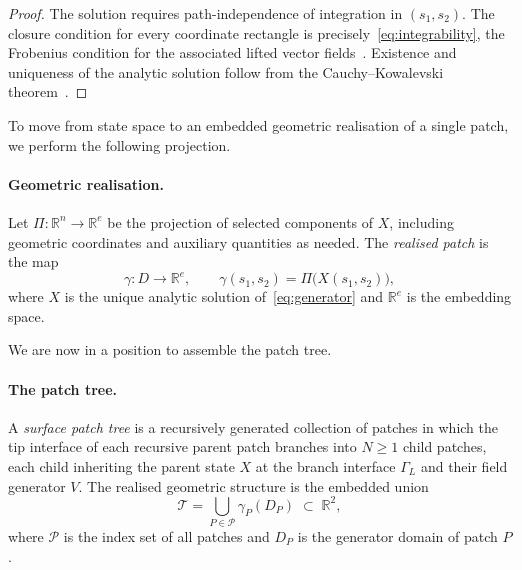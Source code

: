 \documentclass[11pt,a4paper]{article}
\begin{document}
\begin{proof}
The solution requires path-independence of integration in
$(s_1,s_2)$. The closure condition for every coordinate rectangle
is precisely~\eqref{eq:integrability}, the Frobenius condition
for the associated lifted vector fields~\cite{lee2013}. Existence
and uniqueness of the analytic solution follow from the
Cauchy--Kowalevski theorem~\cite{john1982}.
\end{proof}

To move from state space to an embedded geometric realisation of a single patch, 
we perform the following projection.

\paragraph{Geometric realisation.}
Let $\Pi : \mathbb{R}^n \to \mathbb{R}^e$ be the projection of selected
components of $X$, including geometric coordinates and auxiliary quantities 
as needed. The \emph{realised patch} is the
map
\begin{equation}
    \gamma : D \to \mathbb{R}^e, \qquad
    \gamma(s_1,s_2) = \Pi\bigl(X(s_1,s_2)\bigr),
    \label{eq:realization}
\end{equation}
where $X$ is the unique analytic solution of~\eqref{eq:generator} and 
$\mathbb{R}^e$ is the embedding space. 

We are now in a position to assemble the patch tree.
\paragraph{The patch tree.}
A \emph{surface patch tree} is a recursively generated collection
of patches in which the tip interface of each recursive parent patch
branches into $N \geq 1$ child patches, each child inheriting the parent
state $X$ at the branch interface $\Gamma_L$ and their field generator $V$. The realised 
geometric structure is the embedded union
\begin{equation}
    \mathcal{T} = \bigcup_{P \in \mathcal{P}} \gamma_P(D_P)
    \;\subset\; \mathbb{R}^2,
    \label{eq:patch_union}
\end{equation}
where $\mathcal{P}$ is the index set of all patches and $D_P$ is
the generator domain of patch $P$. 
\end{document}
